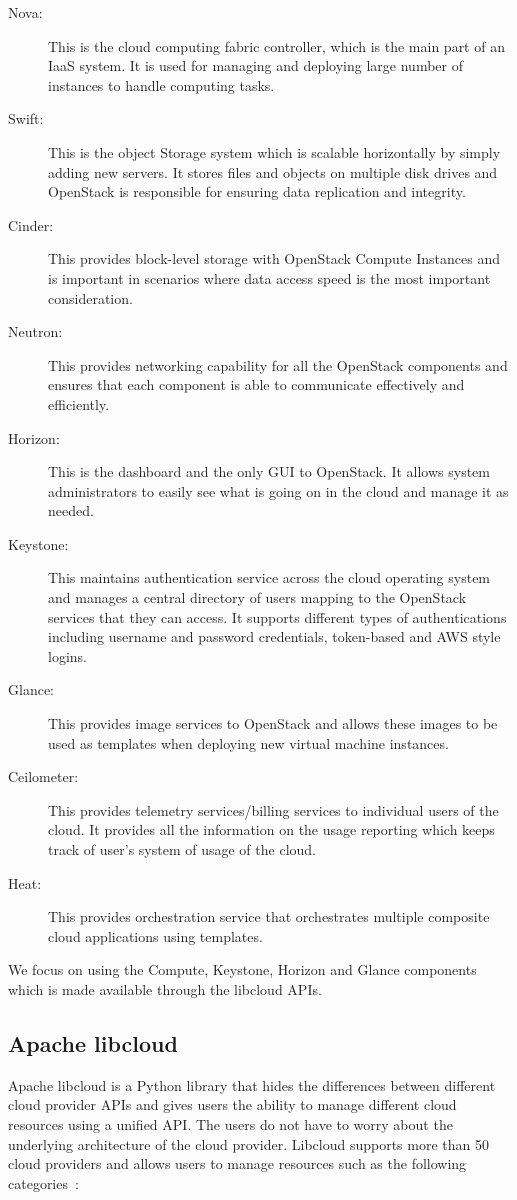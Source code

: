 \begin{description}
   \item[Nova:] This is the cloud computing fabric controller, which is the
   main part of an IaaS system. It is used for managing and deploying large
   number of instances to handle computing tasks. 
   \item[Swift:] This is the object Storage system which is scalable
   horizontally by simply adding new servers. It stores files and objects on
   multiple disk drives and OpenStack is responsible for ensuring data
   replication and integrity. 
   \item[Cinder:] This provides block-level storage with OpenStack Compute
   Instances and is important in scenarios where data access speed is the most
   important consideration. 
   \item[Neutron:] This provides networking capability for all the
   OpenStack components and ensures that each component is able to communicate
   effectively and efficiently. 
   \item[Horizon:] This is the dashboard and the only GUI to OpenStack. It
   allows system administrators to easily see what is going on in the cloud and
   manage it as needed.  
   \item[Keystone:] This maintains authentication service across the cloud
   operating system and manages a central directory of users mapping to the
   OpenStack services that they can access. It supports different types of
   authentications including username and password credentials, token-based and
   AWS style logins.
   \item[Glance:] This provides image services to OpenStack and allows
   these images to be used as templates when deploying new virtual machine
   instances. 
   \item[Ceilometer:] This provides telemetry services/billing services to
   individual users of the cloud. It provides all the information on the usage
   reporting which keeps track of user's system of usage of the cloud.
   \item[Heat:] This provides orchestration service that orchestrates
   multiple composite cloud applications using templates. 
\end{description}
	
We focus on using the Compute, Keystone, Horizon and Glance components which 
is made available through the libcloud APIs. 

\subsection{Apache libcloud}
Apache libcloud is a Python library that hides the differences between 
different cloud provider APIs and gives users the ability to manage different 
cloud resources using a unified API. The users do not have to worry about the
underlying architecture of the cloud provider. Libcloud supports more than 50
cloud providers and allows users to manage resources such as the following
categories~\cite{hid-sp18-516-www-libcloud}:

